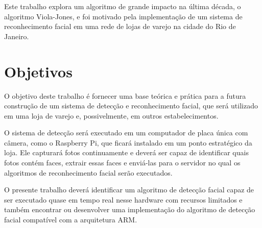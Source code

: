 Este trabalho explora um algoritmo de grande impacto na última década, o algoritmo Viola-Jones, e foi motivado pela implementação de um sistema de reconhecimento facial em uma rede de lojas de varejo na cidade do Rio de Janeiro.

\section*{Objetivos}\label{sec:objetivos}

O objetivo deste trabalho é fornecer uma base teórica e prática para a futura construção de um sistema de detecção e reconhecimento facial, que será utilizado em uma loja de varejo e, possivelmente, em outros estabelecimentos.

O sistema de detecção será executado em um computador de placa única com câmera, como o Raspberry Pi, que ficará instalado em um ponto estratégico da loja.
Ele capturará fotos continuamente e deverá ser capaz de identificar quais fotos contém faces, extrair essas faces e enviá-las para o servidor no qual os algoritmos de reconhecimento facial serão executados.

O presente trabalho deverá identificar um algoritmo de detecção facial capaz de ser executado quase em tempo real nesse hardware com recursos limitados e também encontrar ou desenvolver uma implementação do algoritmo de detecção facial compatível com a arquitetura ARM.